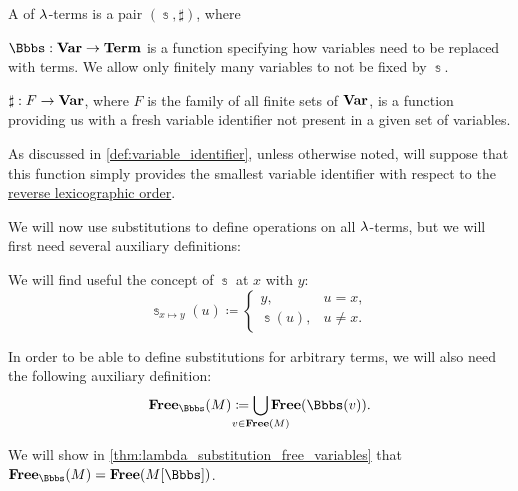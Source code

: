 \begin{definition}\label{def:lambda_term_substitution}\mimprovised
  A  of \( {\mathrm \lambda} \)-terms is a pair \( (\Bbbs, \sharp) \), where
  \begin{thmenum}[series=def:lambda_term_substitution]
     \( \Bbbs: \op*{Var} \to \op*{Term} \) is a function specifying how variables need to be replaced with terms. We allow only finitely many variables to not be fixed by \( \Bbbs \).

     \( \sharp: F \to \op*{Var} \), where \( F \) is the family of all finite sets of \( \op*{Var} \), is a function providing us with a fresh variable identifier not present in a given set of variables.

    As discussed in \cref{def:variable_identifier}, unless otherwise noted, will suppose that this function simply provides the smallest variable identifier with respect to the \hyperref[def:lexicographic_order]{reverse lexicographic order}.
  \end{thmenum}

  We will now use substitutions to define operations on all \( {\mathrm \lambda} \)-terms, but we will first need several auxiliary definitions:
  \begin{thmenum}[resume=def:lambda_term_substitution]
     We will find useful the concept of  \( \Bbbs \) at \( x \) with \( y \):
    \begin{equation}\label{eq:def:lambda_term_substitution/modified}
      \Bbbs_{x \mapsto y}(u) \coloneqq \begin{cases}
        y,        &u = x, \\
        \Bbbs(u), &u \neq x.
      \end{cases}
    \end{equation}

     In order to be able to define substitutions for arbitrary terms, we will also need the following auxiliary definition:
    \begin{equation}\label{eq:def:lambda_term_substitution/free}
      \op*{Free}_\Bbbs(M) \coloneqq \bigcup_{\mathclap{v \in \op*{Free}(M)}} \op*{Free}(\Bbbs(v)).
    \end{equation}

    We will show in \cref{thm:lambda_substitution_free_variables} that \( \op*{Free}_\Bbbs(M) = \op*{Free}(M[\Bbbs]) \).


\end{thmenum}
\end{definition}
